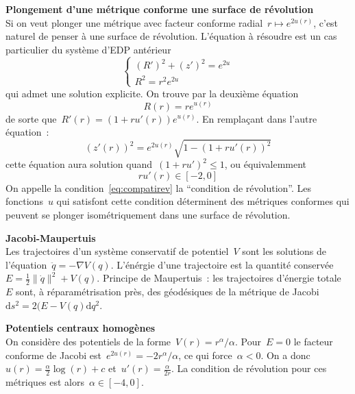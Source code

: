 \documentclass[a4paper,11pt]{article}
\def\ud{\mathrm{d}}
\begin{document}
{\bf Plongement d'une métrique conforme une surface de révolution}\\
Si on veut plonger une métrique avec facteur conforme radial~$r\mapsto
e^{2u(r)}$, c'est naturel de penser à une surface de révolution.
L'équation à résoudre est
un cas particulier du système d'EDP antérieur
\[
	\begin{cases}
		(R')^2+(z')^2=e^{2u}\\
		R^2=r^2e^{2u}
	\end{cases}
\]
qui admet une solution explicite.  On trouve par la deuxième équation
\[
	R(r)=re^{u(r)}
\]
de sorte que~$R'(r)=(1+ru'(r))e^{u(r)}$.
En remplaçant dans l'autre équation~:
\[
	(z'(r))^2=e^{2u(r)}\sqrt{1-\left(1+ru'(r)\right)^2}
\]
cette équation aura solution quand~$(1+ru')^2\le 1$, ou équivalemment
\begin{equation}\label{eq:compatirev}
	ru'(r)\in[-2,0]
\end{equation}
On appelle la condition~\ref{eq:compatirev} la ``condition de révolution''.
Les fonctions~$u$ qui satisfont cette condition déterminent des métriques
conformes qui peuvent se plonger isométriquement dans une surface de
révolution.

{\bf Jacobi-Maupertuis}\\
Les trajectoires d'un système conservatif de potentiel~$V$ sont les solutions
de l'équation~$\ddot q=-\nabla V(q)$.  L'énérgie d'une trajectoire
est la quantité conservée~$E=\tfrac12\|\dot q\|^2+V(q)$.  Principe de
Maupertuis~: les trajectoires d'énergie totale~$E$ sont, à réparamétrisation
près, des géodésiques de la métrique de Jacobi~$\ud s^2=2(E-V(q)\ud q^2$.

{\bf Potentiels centraux homogènes}\\
On considère des potentiels de la forme~$V(r)=r^α/α$.  Pour~$E=0$ le facteur
conforme de Jacobi est~$e^{2u(r)}=-2r^α/α$, ce qui force~$α<0$.  On a
donc~$u(r)=\frac{α}{2}\log(r)+c$ et~$u'(r)=\frac{α}{2r}$. La condition de
révolution pour ces métriques est alors~$α\in[-4,0]$.
\end{document}
